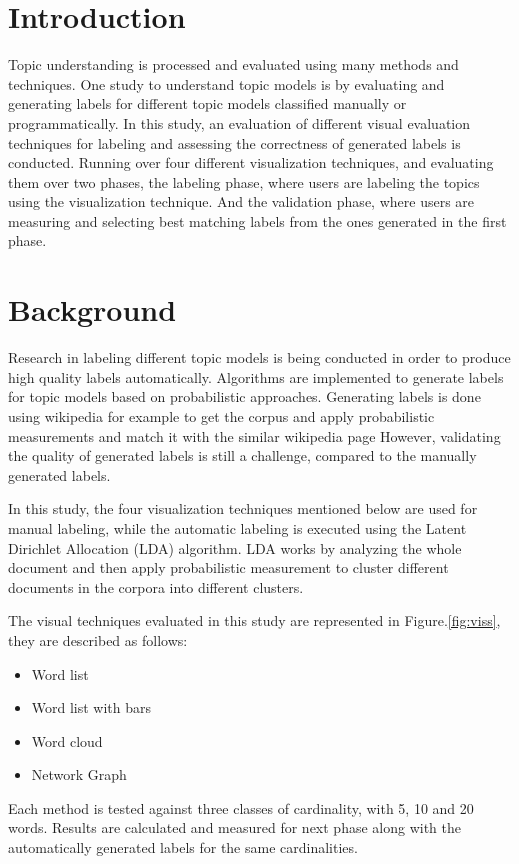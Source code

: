 \section{Introduction}
\label{sec:intro}

Topic understanding is processed and evaluated using many methods and techniques. One study to understand topic models is by evaluating and
generating labels for different topic models classified manually or programmatically. In this study, an evaluation of different visual evaluation techniques
for labeling and assessing the correctness of generated labels is conducted. Running over four different visualization techniques, and evaluating them
over two phases, the labeling phase, where users are labeling the topics using the visualization technique. And the validation phase, where users are
measuring and selecting best matching labels from the ones generated in the first phase.

\section{Background}
\label{sec:bg}

Research in labeling different topic models is being conducted in order to produce high quality labels automatically. Algorithms are implemented
to generate labels for topic models based on probabilistic approaches. Generating labels
is done using wikipedia for example to get the corpus and apply probabilistic measurements and match it with the similar wikipedia page
However, validating the quality of generated labels is still a challenge, compared to the manually generated labels.

\newParagraph
In this study, the four visualization techniques mentioned below are used for manual labeling, while the automatic labeling is executed using the
Latent Dirichlet Allocation (LDA) algorithm. LDA works by analyzing the whole document and then apply probabilistic measurement to cluster different documents
in the corpora into different clusters.


\newParagraph
The visual techniques evaluated in this study are represented in Figure.\ref{fig:viss}, they are described as follows:
\begin{itemize}
  \item Word list
  \item Word list with bars
  \item Word cloud
  \item Network Graph
\end{itemize}

\newParagraph
Each method is tested against three classes of cardinality, with 5, 10 and 20 words. Results are calculated and measured for next phase along with the automatically
generated labels for the same cardinalities.
